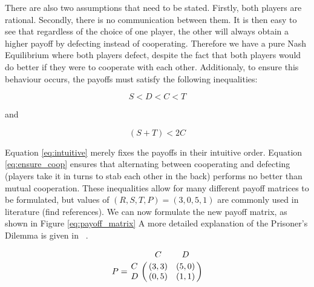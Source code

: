 There are also two assumptions that need to be stated.
Firstly, both players are rational.
Secondly, there is no communication between them.
It is then easy to see that regardless of the choice of one player, the other will always obtain a higher payoff by defecting instead of cooperating.
Therefore we have a pure Nash Equilibrium where both players defect, despite the fact that both players would do better if they were to cooperate with each other.
Additionaly, to ensure this behaviour occurs, the payoffs must satisfy the following inequalities:

\begin{equation}\label{eq:intuitive}
S < D < C < T
\end{equation}

and

\begin{equation}\label{eq:ensure_coop}
(S + T) < 2 C
\end{equation}

Equation \ref{eq:intuitive} merely fixes the payoffs in their intuitive order.
Equation \ref{eq:ensure_coop} ensures that alternating between cooperating and defecting (players take it in turns to stab each other in the back) performs no better than mutual cooperation.
These inequalities allow for many different payoff matrices to be formulated, but values of $(R, S, T, P) = (3, 0, 5, 1)$ are commonly used in literature (find references).
We can now formulate the new payoff matrix, as shown in Figure \ref{eq:payoff_matrix}
A more detailed explanation of the Prisoner's Dilemma is given in ~\cite{Gotts2003}.

\begin{equation}\label{eq:payoff_matrix}
% 
P = \bordermatrix{~ & C & D \cr
                  C & (3, 3) & (5, 0) \cr
                  D & (0, 5) & (1, 1) \cr}
% 
\end{equation}













